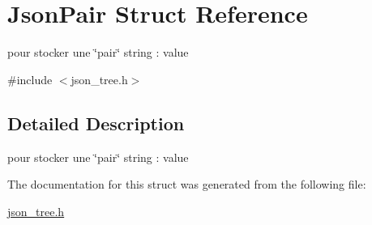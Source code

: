 \hypertarget{structJsonPair}{}\section{Json\+Pair Struct Reference}
\label{structJsonPair}


pour stocker une \char`\"{}pair\char`\"{} string \+: value  




{\ttfamily \#include $<$json\+\_\+tree.\+h$>$}



\subsection{Detailed Description}
pour stocker une \char`\"{}pair\char`\"{} string \+: value 

The documentation for this struct was generated from the following file\+:\begin{DoxyCompactItemize}
\item 
\hyperlink{json__tree_8h}{json\+\_\+tree.\+h}\end{DoxyCompactItemize}
